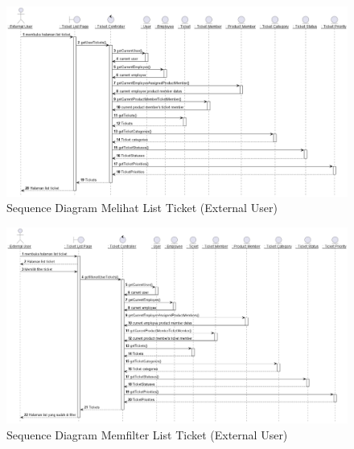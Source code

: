 \documentclass[12pt]{article}
\begin{document}
\begin{enumerate}[label=\textbf{4.\arabic*.}]
\begin{enumerate} [label=\textbf{4.2.\arabic*.}, wide, labelwidth=!, labelindent=0pt]
\begin{enumerate}[label=\textbf{4.2.2.\arabic*.}, wide, labelwidth=!, labelindent=0pt]
\begin{enumerate}[label=\arabic*.]
                
                \begin{figure}
                    \centering \includegraphics[width=\textwidth]{out/plantuml/sequence/ex/ex1/Melihat List Ticket.png}
                    \caption{Sequence Diagram Melihat List Ticket (External User)}
                    \label{fig:SQ-PIC-01}
                \end{figure}

                \begin{figure}
                    \centering \includegraphics[width=\textwidth]{out/plantuml/sequence/ex/ex2/Memfilter List Ticket.png}
                    \caption{Sequence Diagram Memfilter List Ticket (External User)}
                    \label{fig:SQ-PIC-02}
                \end{figure}


\end{enumerate}
\end{enumerate}
\end{enumerate}
\end{enumerate}
\end{document}
